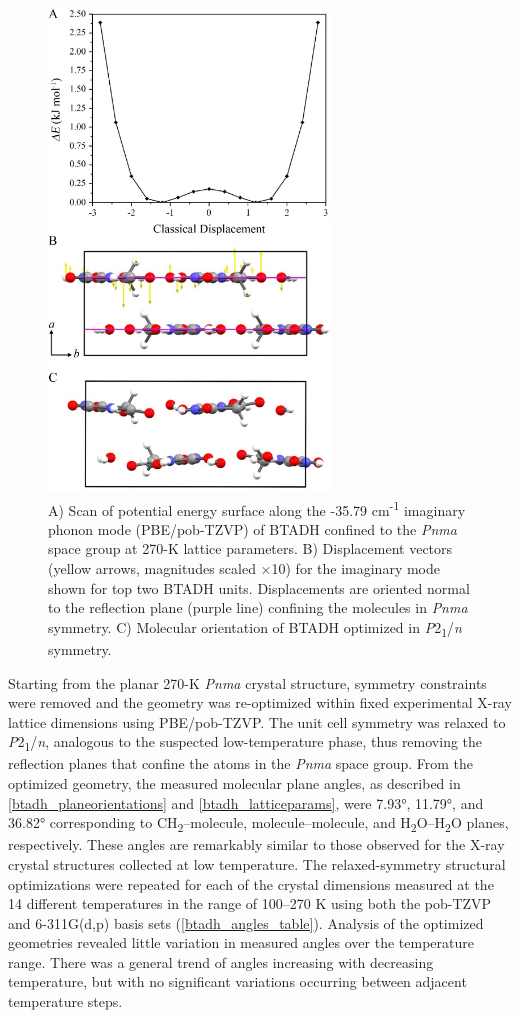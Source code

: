 \begin{figure}[h!]
  \center
  \includegraphics[width=7.5cm]{src/figures/btadh_figs/btadh_fig4.png}
  \caption{A) Scan of potential energy surface along the -35.79 cm\textsuperscript{-1} imaginary phonon mode (PBE/pob-TZVP) of BTADH confined to the \textit{Pnma} space group at 270-K lattice parameters. B) Displacement vectors (yellow arrows, magnitudes scaled ×10) for the imaginary mode shown for top two BTADH units. Displacements are oriented normal to the reflection plane (purple line) confining the molecules in \textit{Pnma} symmetry. C) Molecular orientation of BTADH optimized in \textit{P}2\textsubscript{1}/\textit{n} symmetry.}
  \label{doublewell}
\end{figure}
\newpage
\par Starting from the planar 270-K \textit{Pnma} crystal structure, symmetry constraints were removed and the geometry was re-optimized within fixed experimental X-ray lattice dimensions using PBE/pob-TZVP. The unit cell symmetry was relaxed to \textit{P}2\textsubscript{1}/\textit{n}, analogous to the suspected low-temperature phase, thus removing the reflection planes that confine the atoms in the \textit{Pnma} space group. From the optimized geometry, the measured molecular plane angles, as described in \autoref{btadh_planeorientations} and \autoref{btadh_latticeparams}, were 7.93°, 11.79°, and 36.82° corresponding to CH\textsubscript{2}–molecule, molecule–molecule, and H\textsubscript{2}O–H\textsubscript{2}O planes, respectively. These angles are remarkably similar to those observed for the X-ray crystal structures collected at low temperature. The relaxed-symmetry structural optimizations were repeated for each of the crystal dimensions measured at the 14 different temperatures in the range of 100–270 K using both the pob-TZVP and 6-311G(d,p) basis sets (\autoref{btadh_angles_table}). Analysis of the optimized geometries revealed little variation in measured angles over the temperature range. There was a general trend of angles increasing with decreasing temperature, but with no significant variations occurring between adjacent temperature steps.
